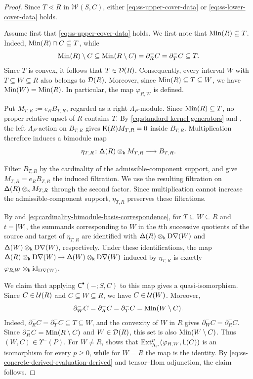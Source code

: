 \begin{proof}
Since $T\lessdot R$ in $\mathcal W(S,C)$, either
\eqref{eq:ss-upper-cover-data} or
\eqref{eq:ss-lower-cover-data} holds.

Assume first that \eqref{eq:ss-upper-cover-data} holds.
We first note that $\operatorname{Min}(R)\subseteq T$.  Indeed,
$\operatorname{Min}(R)\cap C\subseteq T$, while
\[
\operatorname{Min}(R)\setminus C
\subseteq
\operatorname{Min}(R\setminus C)
=
\partial_R^-C
=
\partial_T^-C
\subseteq T.
\]
Since $T$ is convex, it follows that $T\in\mathcal D(R)$.  Consequently,
every interval $W$ with $T\subseteq W\subseteq R$ also belongs to
$\mathcal D(R)$.  Moreover, since $\operatorname{Min}(R)\subseteq T\subseteq W$, we have $\operatorname{Min}(W)=\operatorname{Min}(R)$. In particular, the map $\varphi_{R,W}$ is defined.


Put $M_{T,R}:=e_RB_{T,R}$, regarded as a right $\Lambda_P$-module.
Since $\operatorname{Min}(R)\subseteq T$, no proper relative upset of $R$ contains
$T$.  By \eqref{eq:standard-kernel-generators} and
, the left
$\Lambda_P$-action on $B_{T,R}$ gives
$\mathsf K(R)M_{T,R}=0$ inside $B_{T,R}$.
Multiplication therefore induces a bimodule map
\[
\eta_{T,R}\colon
\mathsf\Delta(R)\otimes_{\mathsf{k}} M_{T,R}
\longrightarrow
B_{T,R}.
\]


Filter $B_{T,R}$ by the cardinality of the admissible-component
support, and give $M_{T,R}=e_RB_{T,R}$ the induced filtration.
We use the resulting filtration on
$\mathsf\Delta(R)\otimes_{\mathsf{k}} M_{T,R}$ through the second factor.
Since multiplication cannot increase 
the admissible-component support, $\eta_{T,R}$ preserves these filtrations.

By  and
\eqref{eq:cardinality-bimodule-basis-correspondence}, for
$T\subseteq W\subseteq R$ and $t=|W|$, the summands corresponding
to $W$ in the $t$th successive quotients of the source and target
of $\eta_{T,R}$ are identified with
$\mathsf\Delta(R)\otimes_{\mathsf{k}}\mathrm D\mathsf\nabla(W)$ and
$\mathsf\Delta(W)\otimes_{\mathsf{k}}\mathrm D\mathsf\nabla(W)$, respectively.
Under these identifications, the map 
$\mathsf\Delta(R)\otimes_{\mathsf{k}}\mathrm D\mathsf\nabla(W)\to \mathsf\Delta(W)\otimes_{\mathsf{k}}\mathrm D\mathsf\nabla(W)$ 
induced by $\eta_{T,R}$ is exactly
$\varphi_{R,W}\otimes_{\mathsf{k}}\operatorname{id}_{\mathrm D\mathsf\nabla(W)}$.

We claim that applying $\mathsf C^\bullet(-;S,C)$ to this map gives
a quasi-isomorphism. Since $C\in\mathcal U(R)$ and
$C\subseteq W\subseteq R$, we have $C\in\mathcal U(W)$. Moreover,
\[
\partial_W^-C
=
\partial_R^-C
=
\partial_T^-C
=
\operatorname{Min}(W\setminus C).
\]
Indeed, $\partial_R^-C=\partial_T^-C\subseteq T\subseteq W$, and
the convexity of $W$ in $R$ gives
$\partial_W^-C=\partial_R^-C$. Since
$\partial_R^-C=\operatorname{Min}(R\setminus C)$ and $W\in\mathcal D(R)$, this set is
also $\operatorname{Min}(W\setminus C)$. Thus $(W,C)\in\Upsilon^-(P)$.
For $W\neq R$,  shows
that $\operatorname{Ext}_{\Lambda_P}^p(\varphi_{R,W},\mathsf L(C))$ is an isomorphism
for every $p\geq0$, while for $W=R$ the map is the identity.
By \eqref{eq:ss-concrete-derived-evaluation-derived} and
tensor--Hom adjunction, the claim follows.


\end{proof}

